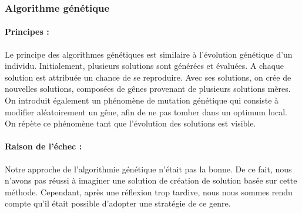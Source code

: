 \documentclass[11pt]{article}
\begin{document}
\subsubsection{Algorithme génétique}
\paragraph{Principes :}{
Le principe des algorithmes génétiques est similaire à l'évolution génétique d'un individu. Initialement, plusieurs solutions sont générées et évaluées. A chaque solution est attribuée un chance de se reproduire. Avec ses solutions, on crée de nouvelles solutions, composées de gênes provenant de plusieurs solutions mères. On introduit également un phénomène de mutation génétique qui consiste à modifier aléatoirement un gêne, afin de ne pas tomber dans un optimum local.
On répète ce phénomène tant que l'évolution des solutions est visible. 
}
\paragraph{Raison de l'échec :}{
Notre approche de l'algorithmie génétique n'était pas la bonne. De ce fait, nous n'avons pas réussi à imaginer une solution de création de solution basée sur cette méthode. Cependant, après une réflexion trop tardive, nous nous sommes rendu compte qu'il était possible d'adopter une stratégie de ce genre.
}

\end{document}
